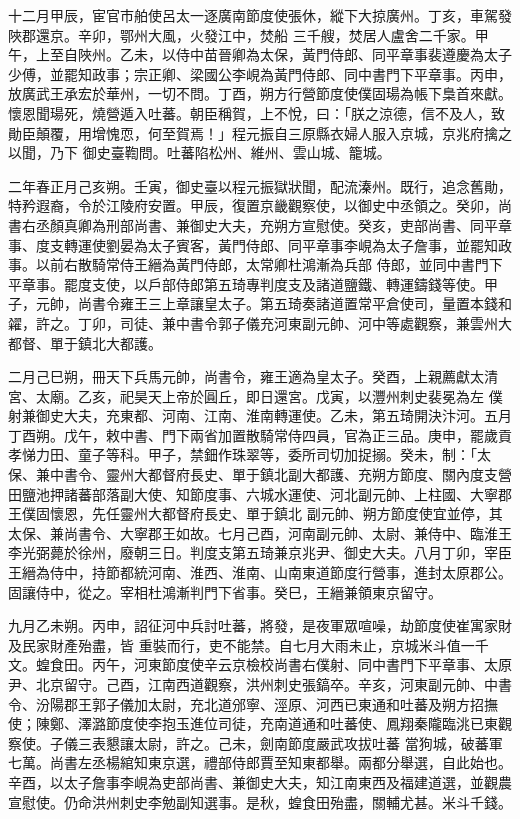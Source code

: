 \begin{pinyinscope}
 十二月甲辰，宦官市舶使呂太一逐廣南節度使張休，縱下大掠廣州。丁亥，車駕發陜郡還京。辛卯，鄂州大風，火發江中，焚船
 三千艘，焚居人盧舍二千家。甲午，上至自陜州。乙未，以侍中苗晉卿為太保，黃門侍郎、同平章事裴遵慶為太子少傅，並罷知政事；宗正卿、梁國公李峴為黃門侍郎、同中書門下平章事。丙申，放廣武王承宏於華州，一切不問。丁酉，朔方行營節度使僕固瑒為帳下梟首來獻。懷恩聞瑒死，燒營遁入吐蕃。朝臣稱賀，上不悅，曰：「朕之涼德，信不及人，致勛臣顛覆，用增愧恧，何至賀焉！」程元振自三原縣衣婦人服入京城，京兆府擒之以聞，乃下
 御史臺鞫問。吐蕃陷松州、維州、雲山城、籠城。



 二年春正月己亥朔。壬寅，御史臺以程元振獄狀聞，配流溱州。既行，追念舊勛，特矜遐裔，令於江陵府安置。甲辰，復置京畿觀察使，以御史中丞領之。癸卯，尚書右丞顏真卿為刑部尚書、兼御史大夫，充朔方宣慰使。癸亥，吏部尚書、同平章事、度支轉運使劉晏為太子賓客，黃門侍郎、同平章事李峴為太子詹事，並罷知政事。以前右散騎常侍王縉為黃門侍郎，太常卿杜鴻漸為兵部
 侍郎，並同中書門下平章事。罷度支使，以戶部侍郎第五琦專判度支及諸道鹽鐵、轉運鑄錢等使。甲子，元帥，尚書令雍王三上章讓皇太子。第五琦奏諸道置常平倉使司，量置本錢和糴，許之。丁卯，司徒、兼中書令郭子儀充河東副元帥、河中等處觀察，兼雲州大都督、單于鎮北大都護。



 二月己巳朔，冊天下兵馬元帥，尚書令，雍王適為皇太子。癸酉，上親薦獻太清宮、太廟。乙亥，祀昊天上帝於圓丘，即日還宮。戊寅，以灃州刺史裴冕為左
 僕射兼御史大夫，充東都、河南、江南、淮南轉運使。乙未，第五琦開決汴河。五月丁酉朔。戊午，敕中書、門下兩省加置散騎常侍四員，官為正三品。庚申，罷歲貢孝悌力田、童子等科。甲子，禁鈿作珠翠等，委所司切加捉搦。癸未，制：「太保、兼中書令、靈州大都督府長史、單于鎮北副大都護、充朔方節度、關內度支營田鹽池押諸蕃部落副大使、知節度事、六城水運使、河北副元帥、上柱國、大寧郡王僕固懷恩，先任靈州大都督府長史、單于鎮北
 副元帥、朔方節度使宜並停，其太保、兼尚書令、大寧郡王如故。七月己酉，河南副元帥、太尉、兼侍中、臨淮王李光弼薨於徐州，廢朝三日。判度支第五琦兼京兆尹、御史大夫。八月丁卯，宰臣王縉為侍中，持節都統河南、淮西、淮南、山南東道節度行營事，進封太原郡公。固讓侍中，從之。宰相杜鴻漸判門下省事。癸巳，王縉兼領東京留守。



 九月乙未朔。丙申，詔征河中兵討吐蕃，將發，是夜軍眾喧噪，劫節度使崔寓家財及民家財產殆盡，皆
 重裝而行，吏不能禁。自七月大雨未止，京城米斗值一千文。蝗食田。丙午，河東節度使辛云京檢校尚書右僕射、同中書門下平章事、太原尹、北京留守。己酉，江南西道觀察，洪州刺史張鎬卒。辛亥，河東副元帥、中書令、汾陽郡王郭子儀加太尉，充北道邠寧、涇原、河西已東通和吐蕃及朔方招撫使；陳鄭、澤潞節度使李抱玉進位司徒，充南道通和吐蕃使、鳳翔秦隴臨洮已東觀察使。子儀三表懇讓太尉，許之。己未，劍南節度嚴武攻拔吐蕃
 當狗城，破蕃軍七萬。尚書左丞楊綰知東京選，禮部侍郎賈至知東都舉。兩都分舉選，自此始也。辛酉，以太子詹事李峴為吏部尚書、兼御史大夫，知江南東西及福建道選，並觀農宣慰使。仍命洪州刺史李勉副知選事。是秋，蝗食田殆盡，關輔尤甚。米斗千錢。




\end{pinyinscope}
